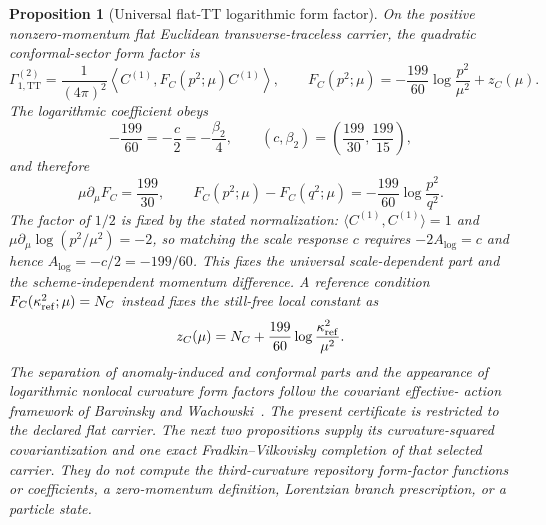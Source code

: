 \documentclass[11pt]{article}
\newtheorem{proposition}[theorem]{Proposition}
\theoremstyle{definition}
\theoremstyle{remark}
\begin{document}
\begin{proposition}[Universal flat-TT logarithmic form factor]
On the positive nonzero-momentum flat Euclidean transverse-traceless carrier,
the quadratic conformal-sector form factor is
\[
 \Gamma_{1,\mathrm{TT}}^{(2)}
 =\frac1{(4\pi)^2}
 \left\langle C^{(1)},F_C(p^2;\mu)C^{(1)}\right\rangle,
 \qquad
 F_C(p^2;\mu)=-\frac{199}{60}\log\frac{p^2}{\mu^2}+z_C(\mu).
\]
The logarithmic coefficient obeys
\[
 -\frac{199}{60}=-\frac c2=-\frac{\beta_2}{4},
 \qquad
 (c,\beta_2)=\left(\frac{199}{30},\frac{199}{15}\right),
\]
and therefore
\[
 \mu\partial_\mu F_C=\frac{199}{30},
 \qquad
 F_C(p^2;\mu)-F_C(q^2;\mu)
 =-\frac{199}{60}\log\frac{p^2}{q^2}.
\]
The factor of $1/2$ is fixed by the stated normalization:
$\langle C^{(1)},C^{(1)}\rangle=1$ and
$\mu\partial_\mu\log(p^2/\mu^2)=-2$, so matching the scale response $c$
requires $-2A_{\log}=c$ and hence $A_{\log}=-c/2=-199/60$.
This fixes the universal scale-dependent part and the scheme-independent
momentum difference.  A reference condition
$F_C(\kappa_{\rm ref}^2;\mu)=N_C$ instead fixes the still-free local constant
as
\[
 z_C(\mu)=N_C+\frac{199}{60}
 \log\frac{\kappa_{\rm ref}^2}{\mu^2}.
\]
The separation of anomaly-induced and conformal parts and the appearance of
logarithmic nonlocal curvature form factors follow the covariant effective-
action framework of Barvinsky and Wachowski~\cite{BarvinskyWachowski}.  The
present certificate is restricted to the declared flat carrier.  The next
two propositions supply its curvature-squared covariantization and one exact
Fradkin--Vilkovisky completion of that selected carrier.  They do not compute
the third-curvature repository form-factor functions or coefficients, a zero-momentum definition, Lorentzian
branch prescription, or a particle state.
\end{proposition}
\end{document}
